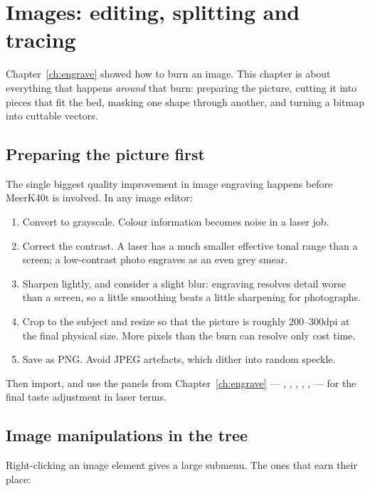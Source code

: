 \chapter{Images: editing, splitting and tracing}
\label{ch:images}

Chapter~\ref{ch:engrave} showed how to burn an image. This chapter is about
everything that happens \emph{around} that burn: preparing the picture, cutting
it into pieces that fit the bed, masking one shape through another, and turning a
bitmap into cuttable vectors.

\section{Preparing the picture first}

The single biggest quality improvement in image engraving happens before MeerK40t
is involved. In any image editor:

\begin{enumerate}[leftmargin=1.6em]
  \item Convert to grayscale. Colour information becomes noise in a laser job.
  \item Correct the contrast. A laser has a much smaller effective tonal range
        than a screen; a low-contrast photo engraves as an even grey smear.
  \item Sharpen lightly, and consider a slight blur: engraving resolves detail
        worse than a screen, so a little smoothing beats a little sharpening for
        photographs.
  \item Crop to the subject and resize so that the picture is roughly
        200--300\unit{dpi} at the final physical size. More pixels than the burn
        can resolve only cost time.
  \item Save as PNG. Avoid JPEG artefacts, which dither into random speckle.
\end{enumerate}

\noindent Then import, and use the panels from Chapter~\ref{ch:engrave} ---
, , , , ,
 --- for the final taste adjustment in laser terms.

\section{Image manipulations in the tree}

Right-clicking an image element gives a large  submenu. The ones that
earn their place:

